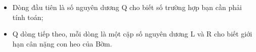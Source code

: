 \begin{itemize}
	\item     Dòng đầu tiên là số nguyên dương Q cho biết số trường hợp bạn cần phải tính toán;   
	\item     Q dòng tiếp theo, mỗi dòng là một cặp số nguyên dương L và R cho biết giới hạn cân nặng con heo của Bờm.   
\end{itemize}